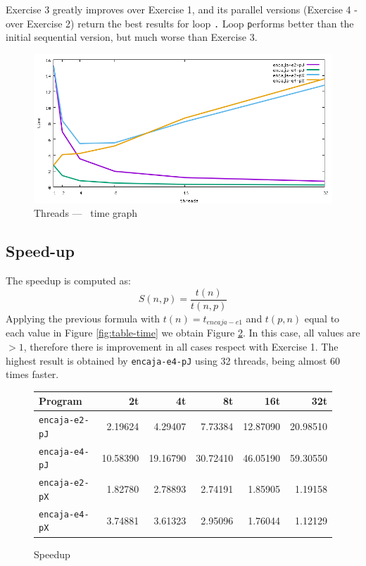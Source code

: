 \documentclass[a4paper]{article}
\newcommand{\m}[1]{\texttt{#1}}
\newcommand{\x}[1]{\m{#1}}
\renewcommand{\j}[1]{\m{#1}}
\begin{document}
Exercise 3 greatly improves over Exercise 1, and its parallel versions (Exercise 4 -over Exercise 2) return the best results for loop \j. Loop \x performs better than the initial sequential version, but much worse than Exercise 3.

\begin{figure}[h]
	\centering
	\includegraphics[width=\textwidth]{../img/time}
	\caption{Threads --- \unskip \, time graph \protect\footnotemark }
	\label{fig:graph-time}
\end{figure}


\subsection{Speed-up}
The speedup is computed as:
$$S(n,p)=\frac{t(n)}{t(n,p)}$$
Applying the previous formula with $t(n)=t_{encaja-e1}$ and $t(p,n)$ equal to each value in Figure \ref{fig:table-time} we obtain Figure \ref{fig:table-speedup}. In this case, all values are $>1$, therefore there is improvement in all cases respect with Exercise 1. The highest result is obtained by \m{encaja-e4-pJ} using 32 threads, being almost 60 times faster.
\begin{figure}[h]
    \centering
    \begin{tabular}{l r r r r r}
        Program               & 2t       & 4t       & 8t       & 16t      & 32t      \\ \hline
        \m{encaja-e2-pJ}	  &  2.19624 &  4.29407 &  7.73384 & 12.87090 & 20.98510 \\
        \m{encaja-e4-pJ} 	  & 10.58390 & 19.16790 & 30.72410 & 46.05190 & 59.30550 \\
        \m{encaja-e2-pX}	  &  1.82780 &  2.78893 &  2.74191 &  1.85905 &  1.19158 \\
        \m{encaja-e4-pX}	  &  3.74881 &  3.61323 &  2.95096 &  1.76044 &  1.12129 \\ \hline
    \end{tabular}
    \caption{Speedup}
    \label{fig:table-speedup}
\end{figure}
\end{document}

